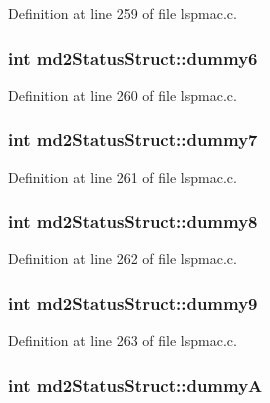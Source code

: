 Definition at line 259 of file lspmac.c.\hypertarget{structmd2StatusStruct_a864a2234ede061ec2380230ebf29ce70}{
\subsubsection[{dummy6}]{\setlength{\rightskip}{0pt plus 5cm}int {\bf md2StatusStruct::dummy6}}}
\label{structmd2StatusStruct_a864a2234ede061ec2380230ebf29ce70}


Definition at line 260 of file lspmac.c.\hypertarget{structmd2StatusStruct_a91f38d814222edeffa67a6a3ab61f5d6}{
\subsubsection[{dummy7}]{\setlength{\rightskip}{0pt plus 5cm}int {\bf md2StatusStruct::dummy7}}}
\label{structmd2StatusStruct_a91f38d814222edeffa67a6a3ab61f5d6}


Definition at line 261 of file lspmac.c.\hypertarget{structmd2StatusStruct_a17f44367cfa4c66ec3ee481863ef4960}{
\subsubsection[{dummy8}]{\setlength{\rightskip}{0pt plus 5cm}int {\bf md2StatusStruct::dummy8}}}
\label{structmd2StatusStruct_a17f44367cfa4c66ec3ee481863ef4960}


Definition at line 262 of file lspmac.c.\hypertarget{structmd2StatusStruct_aa5aadda5a5cb98c6028f8b45e16cd084}{
\subsubsection[{dummy9}]{\setlength{\rightskip}{0pt plus 5cm}int {\bf md2StatusStruct::dummy9}}}
\label{structmd2StatusStruct_aa5aadda5a5cb98c6028f8b45e16cd084}


Definition at line 263 of file lspmac.c.\hypertarget{structmd2StatusStruct_a9fc7dc802d00c22463dd7ddd531e06d7}{
\subsubsection[{dummyA}]{\setlength{\rightskip}{0pt plus 5cm}int {\bf md2StatusStruct::dummyA}}}
\label{structmd2StatusStruct_a9fc7dc802d00c22463dd7ddd531e06d7}


